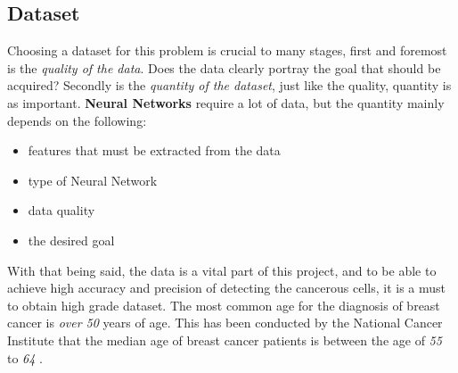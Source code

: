 \documentclass[12pt]{extarticle}
\begin{document}
	\subsection{Dataset}\label{Data}
	Choosing a dataset for this problem is crucial to many stages, first and foremost is the \emph{quality of the data}. Does the data clearly portray the goal that should be acquired? Secondly is the \emph{quantity of the dataset}, just like the quality, quantity is as important. \textbf{Neural Networks} require a lot of data, but the quantity mainly depends on the following:
	\begin{itemize}
		\item features that must be extracted from the data
		\item type of Neural Network
		\item data quality
		\item the desired goal
	\end{itemize}
	With that being said, the data is a vital part of this project, and to be able to achieve high accuracy and precision of detecting the cancerous cells, it is a must to obtain high grade dataset. 
	The most common age for the diagnosis of breast cancer is \emph{over 50} years of age. This has been conducted by the National Cancer Institute that the median age of breast cancer patients is between the age of \emph{55} to \emph{64} \cite{CDC}. 
	\\[5mm]
\end{document}
